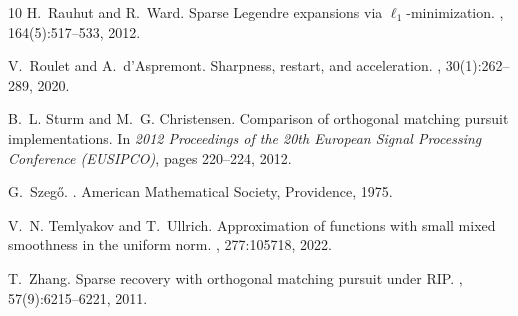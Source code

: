\documentclass[11pt,reqno, a4paper]{article}
\numberwithin{equation}{section}
\begin{document}
\begin{thebibliography}{10}
H.~Rauhut and R.~Ward.
\newblock Sparse {L}egendre expansions via \(\ell_1\)-minimization.
, 164(5):517--533, 2012.

V.~Roulet and A.~d'Aspremont.
\newblock Sharpness, restart, and acceleration.
, 30(1):262--289, 2020.

B.~L. Sturm and M.~G. Christensen.
\newblock Comparison of orthogonal matching pursuit implementations.
\newblock In {\em 2012 Proceedings of the 20th European Signal Processing
  Conference (EUSIPCO)}, pages 220--224, 2012.

G.~Szeg\H{o}.
.
\newblock American Mathematical Society, Providence, 1975.

V.~N. Temlyakov and T.~Ullrich.
\newblock Approximation of functions with small mixed smoothness in the uniform
  norm.
, 277:105718, 2022.

T.~Zhang.
\newblock Sparse recovery with orthogonal matching pursuit under {RIP}.
, 57(9):6215--6221,
  2011.

\end{thebibliography}
\end{document}
